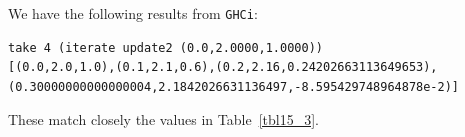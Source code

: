 We have the following results from \verb|GHCi|:
\begin{lstlisting}
take 4 (iterate update2 (0.0,2.0000,1.0000))
[(0.0,2.0,1.0),(0.1,2.1,0.6),(0.2,2.16,0.24202663113649653),(0.30000000000000004,2.1842026631136497,-8.595429748964878e-2)]
\end{lstlisting}
These match closely the values in Table~\ref{tbl15_3}.
